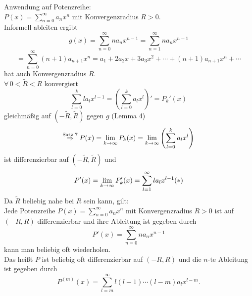 \documentclass[../ana1.tex]{subfiles}
\begin{document}
\begin{prosa}
    Anwendung auf Potenzreihe:\\
    \( P(x) = \sum_{n=0}^\infty a_n x^n \) mit 
    Konvergenzradius \( R > 0 \).\\
    Informell ableiten ergibt 
    \[ g(x) = \sum_{n=0}^\infty n a_n x^{n-1} 
    = \sum_{n=1}^\infty n a_n x^{n-1} \]
    \[ = \sum_{n=0}^\infty (n+1) a_{n+1} x^n 
    = a_1 + 2 a_2 x + 3a_3 x^2 + \cdots + (n+1) a_{n+1} x^n + \cdots \]
    hat auch Konvergenzradius \(R\).\\
    \( \forall \, 0 < \tilde{R} < R \) konvergiert 
    \[ \sum_{l=0}^k l a_l x^{l-1} 
    = \left( \sum_{l=0}^k a_l x^l \right)' = P_k'(x) \]
    gleichmäßig auf \( (-\tilde{R}, \tilde{R}) \) gegen \(g\) (Lemma 4)\\ %
    \[ \overset{\text{Satz 7}}{\Rightarrow} P(x) 
    = \lim\limits_{k\rightarrow\infty} P_k(x) = \lim\limits_{k\rightarrow\infty} \left( 
    \sum_{l=0}^k a_l x^l \right) \]%
    ist differenzierbar auf \( (-\tilde{R},\tilde{R}) \) und 
    \[ P'(x) = \lim\limits_{k\rightarrow\infty} P_k'(x) 
    = \sum_{l=1}^\infty l a_l x^{l-1} (*) \]
    Da \( \tilde{R} \) beliebig nahe bei \(R\) sein kann, gilt:\\
    Jede Potenzreihe \( P(x) = \sum_{n=0}^\infty a_n x^n \) mit 
    Konvergenzradius \( R > 0 \) ist auf \( (-R, R) \) differenzierbar 
    und ihre Ableitung ist gegeben durch 
    \[ P'(x) = \sum_{n=0}^\infty n a_n x^{n-1} \] 
    kann man beliebig oft wiederholen.\\
    Das heißt \(P\) ist beliebig oft differenzierbar auf 
    \( (-R,R) \) und die \(n\)-te Ableitung ist gegeben durch 
    \[ P^{(m)}(x) 
    = \sum_{l=m}^\infty l (l-1)\cdots(l-m) a_l x^{l-m}. \]
\end{prosa}
\end{document}
